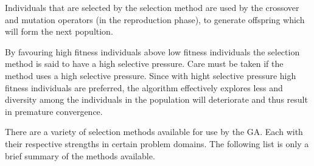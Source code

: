 Individuals that are selected by the selection method are used by the crossover and mutation operators (in the reproduction phase), to generate offspring which will form the next popultion\cite{AdaptiveSAGA,AcceleratingGA}.

By favouring high fitness individuals above low fitness individuals the selection method is said to have a high selective pressure\cite{CompuIntelligenceIntro}. Care must be taken if the method uses a high selective pressure. Since with hight selective pressure high fitness individuals are preferred, the algorithm effectively explores less and diversity among the individuals in the population will deteriorate and thus result in premature convergence\cite{ConstrainedGA, CompuIntelligenceIntro}.

There are a variety of selection methods available for use by the \gls{GA}. Each with their respective strengths in certain problem domains. The following list is only a brief summary of the methods available.
